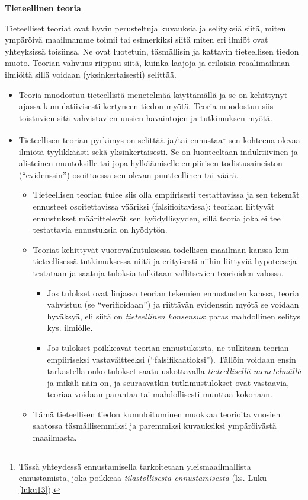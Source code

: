 \documentclass[
]{book}
\providecommand{\tightlist}{%
  \setlength{\itemsep}{0pt}\setlength{\parskip}{0pt}}
\begin{document}
\begin{defblock}{}

\textbf{Tieteellinen teoria}

Tieteelliset teoriat ovat hyvin perusteltuja kuvauksia ja selityksiä siitä, miten ympäröivä maailmamme toimii tai esimerkiksi siitä miten eri ilmiöt ovat yhteyksissä toisiinsa. Ne ovat luotetuin, täsmällisin ja kattavin tieteellisen tiedon muoto. Teorian vahvuus riippuu siitä, kuinka laajoja ja erilaisia reaalimailman ilmiöitä sillä voidaan (yksinkertaisesti) selittää.

\begin{itemize}
\tightlist
\item
  Teoria muodostuu tieteellistä menetelmää käyttämällä ja se on kehittynyt ajassa kumulatiivisesti kertyneen tiedon myötä. Teoria muodostuu siis toistuvien sitä vahvistavien uusien havaintojen ja tutkimuksen myötä.
\item
  Tieteellisen teorian pyrkimys on selittää ja/tai ennustaa\footnote{Tässä yhteydessä ennustamisella tarkoitetaan yleismaailmallista ennustamista, joka poikkeaa \emph{tilastollisesta ennustamisesta} (ks. Luku \ref{luku13}).} sen kohteena olevaa ilmiötä tyylikkäästi sekä yksinkertaisesti. Se on luonteeltaan induktiivinen ja alisteinen muutoksille tai jopa hylkäämiselle empiirisen todistusaineiston (``evidenssin'') osoittaessa sen olevan puutteellinen tai väärä.

  \begin{itemize}
  \tightlist
  \item
    Tieteellisen teorian tulee siis olla empiirisesti testattavissa ja sen tekemät ennusteet osoitettavissa vääriksi (falsifioitavissa): teoriaan liittyvät ennustukset määrittelevät sen hyödyllisyyden, sillä teoria joka ei tee testattavia ennustuksia on hyödytön.
  \item
    Teoriat kehittyvät vuorovaikutuksessa todellisen maailman kanssa kun tieteellisessä tutkimuksessa niitä ja erityisesti niihin liittyviä hypoteeseja testataan ja saatuja tuloksia tulkitaan vallitsevien teorioiden valossa.

    \begin{itemize}
    \tightlist
    \item
      Jos tulokset ovat linjassa teorian tekemien ennustusten kanssa, teoria vahvistuu (se ``verifioidaan'') ja riittävän evidenssin myötä se voidaan hyväksyä, eli siitä on \emph{tieteellinen konsensus}: paras mahdollinen selitys kys. ilmiölle.
    \item
      Jos tulokset poikkeavat teorian ennustuksista, ne tulkitaan teorian empiiriseksi vastaväitteeksi (``falsifikaatioksi''). Tällöin voidaan ensin tarkastella onko tulokset saatu uskottavalla \emph{tieteellisellä menetelmällä} ja mikäli näin on, ja seuraavatkin tutkimustulokset ovat vastaavia, teoriaa voidaan parantaa tai mahdollisesti muuttaa kokonaan.
    \end{itemize}
  \item
    Tämä tieteellisen tiedon kumuloituminen muokkaa teorioita vuosien saatossa täsmällisemmiksi ja paremmiksi kuvauksiksi ympäröivästä maailmasta.


\end{itemize}
\end{itemize}
\end{defblock}
\end{document}
